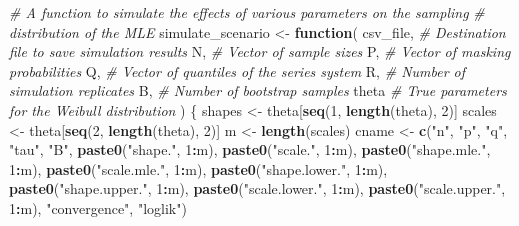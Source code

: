 \documentclass[
]{article}
\newenvironment{Shaded}{\begin{snugshade}}{\end{snugshade}}
\newcommand{\CommentTok}[1]{\textcolor[rgb]{0.56,0.35,0.01}{\textit{#1}}}
\newcommand{\ControlFlowTok}[1]{\textcolor[rgb]{0.13,0.29,0.53}{\textbf{#1}}}
\newcommand{\DecValTok}[1]{\textcolor[rgb]{0.00,0.00,0.81}{#1}}
\newcommand{\KeywordTok}[1]{\textcolor[rgb]{0.13,0.29,0.53}{\textbf{#1}}}
\newcommand{\NormalTok}[1]{#1}
\newcommand{\OperatorTok}[1]{\textcolor[rgb]{0.81,0.36,0.00}{\textbf{#1}}}
\newcommand{\StringTok}[1]{\textcolor[rgb]{0.31,0.60,0.02}{#1}}
\theoremstyle{definition}
\theoremstyle{plain}
\theoremstyle{definition}
\theoremstyle{definition}
\theoremstyle{definition}
\theoremstyle{definition}
\theoremstyle{remark}
\begin{document}
\begin{Shaded}
\begin{Highlighting}[]
\CommentTok{\# A function to simulate the effects of various parameters on the sampling}
\CommentTok{\# distribution of the MLE}
\NormalTok{simulate\_scenario \textless{}{-}}\StringTok{ }\ControlFlowTok{function}\NormalTok{(}
\NormalTok{    csv\_file,            }\CommentTok{\# Destination file to save simulation results}
\NormalTok{    N,                   }\CommentTok{\# Vector of sample sizes}
\NormalTok{    P,                   }\CommentTok{\# Vector of masking probabilities}
\NormalTok{    Q,                   }\CommentTok{\# Vector of quantiles of the series system}
\NormalTok{    R,                   }\CommentTok{\# Number of simulation replicates}
\NormalTok{    B,                   }\CommentTok{\# Number of bootstrap samples}
\NormalTok{    theta                }\CommentTok{\# True parameters for the Weibull distribution}
\NormalTok{) \{}
\NormalTok{  shapes \textless{}{-}}\StringTok{ }\NormalTok{theta[}\KeywordTok{seq}\NormalTok{(}\DecValTok{1}\NormalTok{, }\KeywordTok{length}\NormalTok{(theta), }\DecValTok{2}\NormalTok{)]}
\NormalTok{  scales \textless{}{-}}\StringTok{ }\NormalTok{theta[}\KeywordTok{seq}\NormalTok{(}\DecValTok{2}\NormalTok{, }\KeywordTok{length}\NormalTok{(theta), }\DecValTok{2}\NormalTok{)]}
\NormalTok{  m \textless{}{-}}\StringTok{ }\KeywordTok{length}\NormalTok{(scales)}
\NormalTok{  cname \textless{}{-}}\StringTok{ }\KeywordTok{c}\NormalTok{(}\StringTok{"n"}\NormalTok{, }\StringTok{"p"}\NormalTok{, }\StringTok{"q"}\NormalTok{, }\StringTok{"tau"}\NormalTok{, }\StringTok{"B"}\NormalTok{,}
             \KeywordTok{paste0}\NormalTok{(}\StringTok{"shape."}\NormalTok{, }\DecValTok{1}\OperatorTok{:}\NormalTok{m), }\KeywordTok{paste0}\NormalTok{(}\StringTok{"scale."}\NormalTok{, }\DecValTok{1}\OperatorTok{:}\NormalTok{m),}
             \KeywordTok{paste0}\NormalTok{(}\StringTok{"shape.mle."}\NormalTok{, }\DecValTok{1}\OperatorTok{:}\NormalTok{m), }\KeywordTok{paste0}\NormalTok{(}\StringTok{"scale.mle."}\NormalTok{, }\DecValTok{1}\OperatorTok{:}\NormalTok{m),}
             \KeywordTok{paste0}\NormalTok{(}\StringTok{"shape.lower."}\NormalTok{, }\DecValTok{1}\OperatorTok{:}\NormalTok{m), }\KeywordTok{paste0}\NormalTok{(}\StringTok{"shape.upper."}\NormalTok{, }\DecValTok{1}\OperatorTok{:}\NormalTok{m),}
             \KeywordTok{paste0}\NormalTok{(}\StringTok{"scale.lower."}\NormalTok{, }\DecValTok{1}\OperatorTok{:}\NormalTok{m), }\KeywordTok{paste0}\NormalTok{(}\StringTok{"scale.upper."}\NormalTok{, }\DecValTok{1}\OperatorTok{:}\NormalTok{m),}
             \StringTok{"convergence"}\NormalTok{, }\StringTok{"loglik"}\NormalTok{)}


\end{Highlighting}
\end{Shaded}
\end{document}
